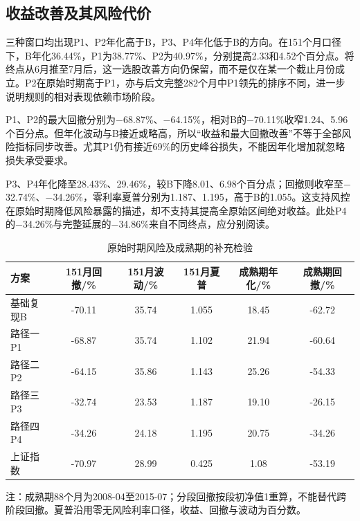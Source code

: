 \subsection{收益改善及其风险代价}
三种窗口均出现P1、P2年化高于B，P3、P4年化低于B的方向。在151个月口径下，B年化36.44\%，P1为38.77\%、P2为40.97\%，分别提高2.33和4.52个百分点。将终点从6月推至7月后，这一选股改善方向仍保留，而不是仅在某一个截止月份成立。P2在原始时期高于P1，亦与后文完整282个月中P1领先的排序不同，进一步说明规则的相对表现依赖市场阶段。

P1、P2的最大回撤分别为$-$68.87\%、$-$64.15\%，相对B的$-$70.11\%收窄1.24、5.96个百分点。但年化波动与B接近或略高，所以“收益和最大回撤改善”不等于全部风险指标同步改善。尤其P1仍有接近69\%的历史峰谷损失，不能因年化增加就忽略损失承受要求。

P3、P4年化降至28.43\%、29.46\%，较B下降8.01、6.98个百分点；回撤则收窄至$-$32.74\%、$-$34.26\%，零利率夏普分别为1.187、1.195，高于B的1.055。这支持风控在原始时期降低风险暴露的描述，却不支持其提高全原始区间绝对收益。此处P4的$-$34.26\%与完整延展的$-$34.86\%来自不同终点，应分别阅读。

\begin{table}[htbp]
\centering
\caption{原始时期风险及成熟期的补充检验}
\renewcommand{\arraystretch}{1.18}
\small
\setlength{\tabcolsep}{4.5pt}
\begin{tabularx}{\textwidth}{@{}p{2.35cm}*{5}{C}@{}}
\toprule
方案 & 151月回撤/\% & 151月波动/\% & 151月夏普 & 成熟期年化/\% & 成熟期回撤/\% \\
\midrule
基础复现B & -70.11 & 35.74 & 1.055 & 18.45 & -62.72 \\
路径一P1 & -68.87 & 35.74 & 1.102 & 21.94 & -60.64 \\
路径二P2 & -64.15 & 35.86 & 1.143 & 25.26 & -54.33 \\
路径三P3 & -32.74 & 23.53 & 1.187 & 19.10 & -26.15 \\
路径四P4 & -34.26 & 24.18 & 1.195 & 20.75 & -34.26 \\
上证指数 & -70.97 & 28.99 & 0.425 & 1.08 & -53.19 \\
\bottomrule
\end{tabularx}
\par\smallskip
\begin{minipage}{\textwidth}\small 注：成熟期88个月为2008-04至2015-07；分段回撤按段初净值1重算，不能替代跨阶段回撤。夏普沿用零无风险利率口径，收益、回撤与波动为百分数。\end{minipage}
\end{table}

